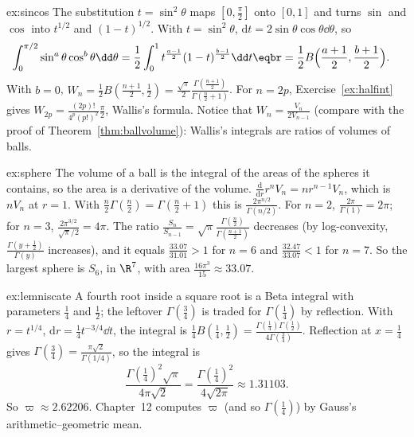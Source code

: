 \begin{solution}{ex:sincos}
\idea The substitution $t=\sin^2\theta$ maps $[0,\frac\pi2]$ onto $[0,1]$ and turns $\sin$ and $\cos$ into $t^{1/2}$ and $(1-t)^{1/2}$.
\writeup With $t=\sin^2\theta$, $\mathrm dt=2\sin\theta\cos\theta\dd\theta$, so
\[
\begin{aligned}\int_0^{\pi/2}\sin^a\theta\cos^b\theta\dd\theta&=\frac12\int_0^1t^{\frac{a-1}2}(1-t)^{\frac{b-1}2}\dd t\eqbr=\frac12B\Bigl(\frac{a+1}2,\frac{b+1}2\Bigr).\end{aligned}
\]
With $b=0$, $W_n=\frac12B(\frac{n+1}2,\frac12)=\frac{\sqrt\pi}2\frac{\Gamma(\frac{n+1}2)}{\Gamma(\frac n2+1)}$. For $n=2p$, Exercise~\ref{ex:halfint} gives
$W_{2p}=\frac{(2p)!}{4^p(p!)^2}\frac\pi2$, Wallis's formula. Notice that $W_n=\frac{V_n}{2V_{n-1}}$ (compare with the proof of Theorem~\ref{thm:ballvolume}): Wallis's integrals are
ratios of volumes of balls.
\end{solution}

\begin{solution}{ex:sphere}
\idea The volume of a ball is the integral of the areas of the spheres it contains, so the area is a derivative of the
volume.
\writeup $\frac{\mathrm d}{\mathrm dr}r^nV_n=nr^{n-1}V_n$, which is $nV_n$ at $r=1$. With $\frac n2\Gamma(\frac n2)=\Gamma(\frac n2+1)$ this is
$\frac{2\pi^{n/2}}{\Gamma(n/2)}$. For $n=2$, $\frac{2\pi}{\Gamma(1)}=2\pi$; for $n=3$, $\frac{2\pi^{3/2}}{\sqrt\pi/2}=4\pi$. The ratio
$\frac{S_n}{S_{n-1}}=\sqrt\pi\frac{\Gamma(\frac n2)}{\Gamma(\frac{n+1}2)}$ decreases (by log-convexity, $\frac{\Gamma(y+\frac12)}{\Gamma(y)}$ increases), and it equals
$\frac{33.07}{31.01}>1$ for $n=6$ and $\frac{32.47}{33.07}<1$ for $n=7$. So the largest sphere is $S_6$, in $\R^7$, with area
$\frac{16\pi^3}{15}\approx33.07$.
\end{solution}

\begin{solution}{ex:lemniscate}
\idea A fourth root inside a square root is a Beta integral with parameters $\frac14$ and $\frac12$; the leftover $\Gamma(\frac34)$ is
traded for $\Gamma(\frac14)$ by reflection.
\writeup With $r=t^{1/4}$, $\mathrm dr=\frac14t^{-3/4}\dd t$, the integral is $\frac14B(\frac14,\frac12)=\frac{\Gamma(\frac14)\Gamma(\frac12)}{4\Gamma(\frac34)}$. Reflection at
$x=\frac14$ gives $\Gamma(\frac34)=\frac{\pi\sqrt2}{\Gamma(1/4)}$, so the integral is
\[
\frac{\Gamma(\frac14)^2\sqrt\pi}{4\pi\sqrt2}=\frac{\Gamma(\frac14)^2}{4\sqrt{2\pi}}\approx1.31103.
\]
So $\varpi\approx2.62206$. Chapter~12 computes $\varpi$ (and so $\Gamma(\frac14)$) by Gauss's arithmetic--geometric mean.
\end{solution}

